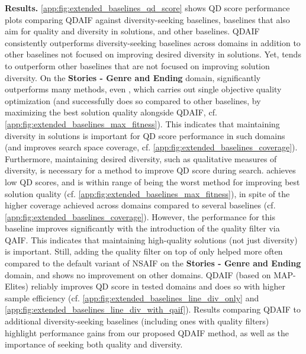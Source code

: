 \textbf{Results.} \cref{app:fig:extended_baselines_qd_score} shows QD score performance plots comparing QDAIF against diversity-seeking baselines, baselines that also aim for quality and diversity in solutions, and other baselines. QDAIF consistently outperforms diversity-seeking baselines across domains in addition to other baselines not focused on improving desired diversity in solutions. Yet, \basesix{} tends to outperform other baselines that are not focused on improving solution diversity. On the \textbf{Stories - Genre and Ending} domain, \basesix{} significantly outperforms many methods, even \basefour, which carries out single objective quality optimization (and successfully does so compared to other baselines, by maximizing the best solution quality alongside QDAIF, cf. \cref{app:fig:extended_baselines_max_fitness}). This indicates that maintaining diversity in solutions is important for QD score performance in such domains (and improves search space coverage, cf. \cref{app:fig:extended_baselines_coverage}). Furthermore, maintaining desired diversity, such as qualitative measures of diversity, is necessary for a method to improve QD score during search. \basefive{} achieves low QD scores, and is within range of being the worst method for improving best solution quality (cf. \cref{app:fig:extended_baselines_max_fitness}), in spite of the higher coverage achieved across domains compared to several baselines (cf. \cref{app:fig:extended_baselines_coverage}). However, the performance for this baseline improves significantly with the introduction of the quality filter via QAIF. This indicates that maintaining high-quality solutions (not just diversity) is important. Still, adding the quality filter on top of \basesix{} only helped more often compared to the default variant of NSAIF on the \textbf{Stories - Genre and Ending} domain, and shows no improvement on other domains. QDAIF (based on MAP-Elites) reliably improves QD score in tested domains and does so with higher sample efficiency (cf. \cref{app:fig:extended_baselines_line_div_only} and \cref{app:fig:extended_baselines_line_div_with_qaif}). Results comparing QDAIF to additional diversity-seeking baselines (including ones with quality filters) highlight performance gains from our proposed QDAIF method, as well as the importance of seeking both quality and diversity.

